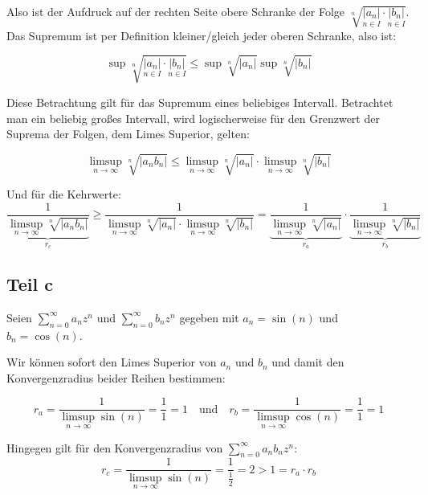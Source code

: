 \documentclass[a4paper,german,12pt,smallheadings]{scrartcl}
\begin{document}
Also ist der Aufdruck auf der rechten Seite obere Schranke der Folge
$\sqrt[n]{\underset{n \in I}{|a_n|} \cdot \underset{n \in I}{|b_n|}}$. Das
Supremum ist per Definition kleiner/gleich jeder oberen Schranke, also ist:

\begin{equation*}
  \sup \sqrt[n]{\underset{n \in I}{|a_n|} \cdot \underset{n \in I}{|b_n|}} \leq \sup \sqrt[n]{|a_n|} \sup \sqrt[n]{|b_n|}
\end{equation*}

Diese Betrachtung gilt für das Supremum eines beliebiges Intervall. Betrachtet
man ein beliebig großes Intervall, wird logischerweise für den Grenzwert der
Suprema der Folgen, dem Limes Superior, gelten:

\begin{equation*}
  \limsup\limits_{n \to \infty} \sqrt[n]{|a_n b_n|} \leq \limsup\limits_{n \to \infty} \sqrt[n]{|a_n|} \cdot \limsup\limits_{n \to \infty} \sqrt[n]{|b_n|}
\end{equation*}

Und für die Kehrwerte:
\begin{equation*}
  \underbrace{\frac{1}{\limsup\limits_{n \to \infty} \sqrt[n]{|a_n b_n|}}}_{r_c} \geq \frac{1}{\limsup\limits_{n \to \infty} \sqrt[n]{|a_n|} \cdot \limsup\limits_{n \to \infty} \sqrt[n]{|b_n|}}= \underbrace{\frac{1}{\limsup\limits_{n \to \infty} \sqrt[n]{|a_n|}}}_{r_a} \cdot \underbrace{\frac{1}{\limsup\limits_{n \to \infty} \sqrt[n]{|b_n|}}}_{r_b}
\end{equation*}

\subsection*{Teil c}

Seien $\sum\limits_{n=0}^{\infty} a_nz^n$ und $\sum\limits_{n=0}^{\infty} b_n
z^n$ gegeben mit $a_n=\sin(n)$ und $b_n=\cos(n)$.

Wir können sofort den Limes Superior von $a_n$ und $b_n$ und damit den
Konvergenzradius beider Reihen bestimmen:

\begin{equation*}
r_a=\frac{1}{\limsup\limits_{n \to \infty} \sin(n)}=\frac{1}{1}=1 \quad \text{und} \quad r_b=\frac{1}{\limsup\limits_{n \to \infty} \cos(n)}=\frac{1}{1}=1
\end{equation*}

Hingegen gilt für den Konvergenzradius von $\sum\limits_{n=0}^{\infty} a_n b_n
z^n$:
\begin{equation*}
r_c=\frac{1}{\limsup\limits_{n \to \infty} \sin(n)}=\frac{1}{\frac{1}{2}}=2>1=r_a \cdot r_b
\end{equation*}
\end{document}
